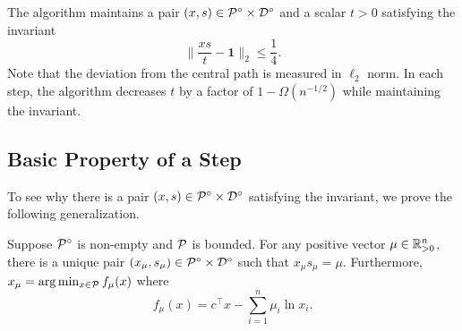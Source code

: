 The algorithm maintains a pair $(x,s)\in\mathcal{P}^{\circ}\times\mathcal{D}^{\circ}$
and a scalar $t>0$ satisfying the invariant 
\[
\|\frac{xs}{t}-\mathbf{1}\|_{2}\leq\frac{1}{4}.
\]
Note that the deviation from the central path is measured in $\ell_{2}$
norm. In each step, the algorithm decreases $t$ by a factor of $1-\Omega(n^{-1/2})$
while maintaining the invariant.

\subsection{Basic Property of a Step}

To see why there is a pair $(x,s)\in\mathcal{P}^{\circ}\times\mathcal{D}^{\circ}$
satisfying the invariant, we prove the following generalization.
\begin{lem}
\label{lem:primal_dual_representation}Suppose $\mathcal{P}^{\circ}$ is
non-empty and $\mathcal{P}$ is bounded. For any positive vector $\mu\in\mathbb{R}^{n}_{>0}$,
there is a unique pair $(x_{\mu},s_{\mu})\in\mathcal{P}^{\circ}\times\mathcal{D}^{\circ}$
such that $x_{\mu}s_{\mu}=\mu$. Furthermore, $x_{\mu}=\arg\min_{x\in\mathcal{P}}f_{\mu}(x)$
where
\[
f_{\mu}(x)=c^{\top}x-\sum^{n}_{i=1}\mu_{i}\ln x_{i}.
\]
\end{lem}

